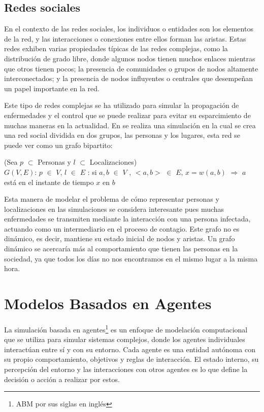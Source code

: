 \subsection{Redes sociales}
En el contexto de las redes sociales, los individuos o entidades son los elementos de la red, 
y las interacciones o conexiones entre ellos forman las aristas. Estas redes exhiben varias propiedades 
típicas de las redes complejas, como la distribución de grado libre, donde algunos nodos tienen 
muchos enlaces mientras que otros tienen pocos; la presencia de comunidades o grupos de nodos altamente 
interconectados; y la presencia de nodos influyentes o centrales que desempeñan un papel importante en la 
red.\autocite{Newman2003}

Este tipo de redes complejas se ha utilizado para simular la propagación de enfermedades y el control que se puede
realizar para evitar su esparcimiento de muchas maneras en la actualidad. En \autocite{Eubank2004} 
se realiza una simulación en la cual se crea una red social dividida en dos grupos, las personas y los lugares, esta red 
se puede ver como un grafo bipartito:
\begin{center}
    (Sea $p$ $\subset$ Personas y $l$ $\subset$ Localizaciones)\\
    $G(V,E)$: $p$ $\in$ $V$, 
$l$ $\in$ $E$ : si $a,b$ $\in$ $V$ , $<a,b>$ $\in$ $E$, $x = w(a,b)$  $\Rightarrow$ $a$ está en el instante de tiempo $x$ en $b$
\end{center} 
Esta manera de modelar el problema de cómo representar personas y localizaciones en las simulaciones se considera 
interesante pues muchas enfermedades se transmiten mediante la interacción con una persona infectada, actuando como un 
intermediario en el proceso de contagio. Este grafo no es dinámico, es decir, mantiene su estado inicial de nodos y aristas.
Un grafo dinámico se acercaría más al comportamiento que tienen las personas en la sociedad, ya que todos los días no nos encontramos
en el mismo lugar a la misma hora.



\section{Modelos Basados en Agentes}
La simulación basada en agentes\footnote{ABM por sus siglas en inglés} es un enfoque de modelación computacional que se utiliza para 
simular sistemas complejos, donde los agentes individuales interactúan entre sí y con su entorno. Cada agente es una entidad 
autónoma con su propio comportamiento, objetivos y reglas de interacción. El estado interno,
su percepción del entorno y las interacciones con otros agentes es lo que define la decisión o acción a realizar por
estos. \autocite{Macal2010} \\ 

